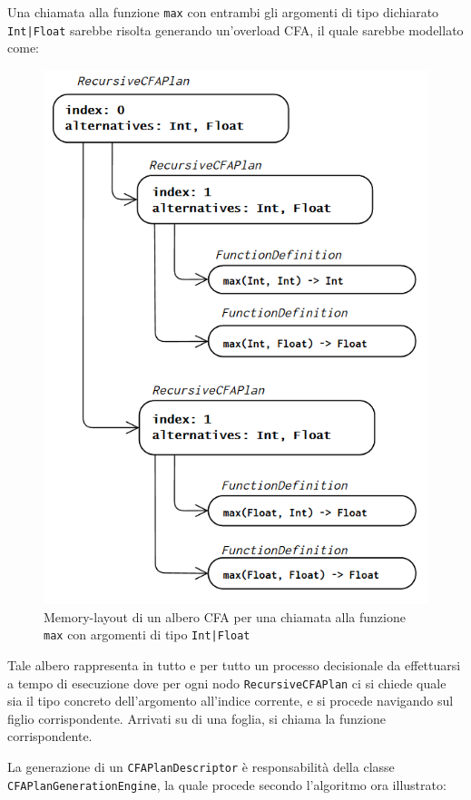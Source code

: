 \newpage

Una chiamata alla funzione \texttt{max} con entrambi gli argomenti di tipo dichiarato \texttt{Int|Float} sarebbe risolta 
generando un'overload CFA, il quale sarebbe modellato come: \\

\begin{figure}[h]
    \centering
        \includegraphics[height=0.9\textwidth]{../../Assets/CFA_ML.png}
    \caption{
        \centering
        Memory-layout di un albero CFA per una chiamata alla funzione
        \texttt{max} con argomenti di tipo \texttt{Int|Float}
    }
\end{figure}
\vspace{0.5cm}

Tale albero rappresenta in tutto e per tutto un processo decisionale da effettuarsi a tempo di esecuzione 
dove per ogni nodo \texttt{RecursiveCFAPlan} ci si chiede quale sia il tipo concreto dell'argomento 
all'indice corrente, e si procede navigando sul figlio corrispondente. Arrivati su di una foglia, si chiama 
la funzione corrispondente. \\

\newpage

La generazione di un \texttt{CFAPlanDescriptor} è responsabilità della classe \texttt{CFAPlanGenerationEngine}, 
la quale procede secondo l'algoritmo ora illustrato: \\ 

